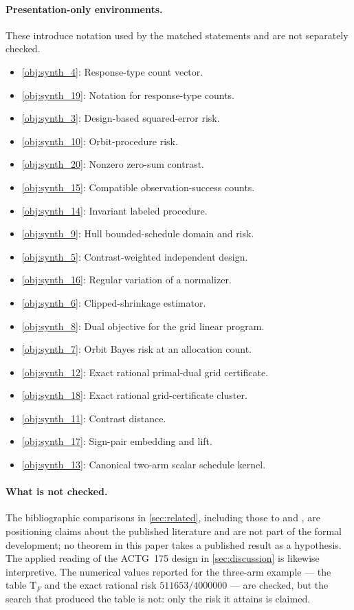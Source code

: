 \paragraph{Presentation-only environments.} These introduce notation used by the matched statements and are not separately checked.
\begin{itemize}\setlength{\itemsep}{0pt}
\item \cref{obj:synth_4}: Response-type count vector.
\item \cref{obj:synth_19}: Notation for response-type counts.
\item \cref{obj:synth_3}: Design-based squared-error risk.
\item \cref{obj:synth_10}: Orbit-procedure risk.
\item \cref{obj:synth_20}: Nonzero zero-sum contrast.
\item \cref{obj:synth_15}: Compatible observation-success counts.
\item \cref{obj:synth_14}: Invariant labeled procedure.
\item \cref{obj:synth_9}: Hull bounded-schedule domain and risk.
\item \cref{obj:synth_5}: Contrast-weighted independent design.
\item \cref{obj:synth_16}: Regular variation of a normalizer.
\item \cref{obj:synth_6}: Clipped-shrinkage estimator.
\item \cref{obj:synth_8}: Dual objective for the grid linear program.
\item \cref{obj:synth_7}: Orbit Bayes risk at an allocation count.
\item \cref{obj:synth_12}: Exact rational primal-dual grid certificate.
\item \cref{obj:synth_18}: Exact rational grid-certificate cluster.
\item \cref{obj:synth_11}: Contrast distance.
\item \cref{obj:synth_17}: Sign-pair embedding and lift.
\item \cref{obj:synth_13}: Canonical two-arm scalar schedule kernel.
\end{itemize}

\paragraph{What is not checked.} The bibliographic comparisons in \cref{sec:related}, including those to \citet{sudijono_dobriban_tchetgen_2026_sharp} and \citet{hull_2026_bounded}, are positioning claims about the published literature and are not part of the formal development; no theorem in this paper takes a published result as a hypothesis. The applied reading of the ACTG~175 design in \cref{sec:discussion} is likewise interpretive. The numerical values reported for the three-arm example --- the table \(\mathrm T_F\) and the exact rational risk \(511653/4000000\) --- are checked, but the search that produced the table is not: only the risk it attains is claimed.

